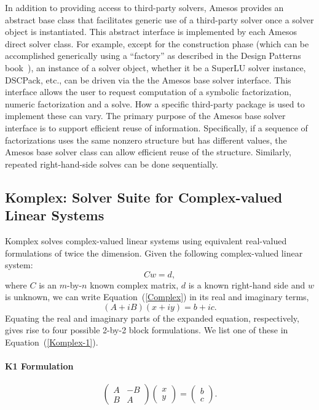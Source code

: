 \documentclass[acmtoms,acmnow]{acmtrans2m}
\begin{document}
In addition to providing access to third-party solvers, Amesos
provides an abstract base class that facilitates generic use of a
third-party solver once a solver object is instantiated.  This
abstract interface is implemented by each Amesos direct solver class.
For example, except for the construction phase (which can be
accomplished generically using a ``factory'' as described in the
Design Patterns book~\cite{Gamma}), an instance of a solver object,
whether it be a SuperLU solver instance, DSCPack, etc., can be driven
via the the Amesos base solver interface.  This interface allows the
user to request computation of a symbolic factorization, numeric
factorization and a solve.  How a specific third-party package is used
to implement these can vary.  The primary purpose of the Amesos base
solver interface is to support efficient reuse of information.
Specifically, if a sequence of factorizations uses the same nonzero
structure but has different values, the Amesos base solver class can
allow efficient reuse of the structure.  Similarly, repeated
right-hand-side solves can be done sequentially.

\subsection{Komplex: Solver Suite for Complex-valued Linear Systems}

Komplex solves complex-valued linear systems using equivalent 
real-valued formulations of twice the dimension.  Given the following 
complex-valued linear system:
\begin{equation}
\label{Complex}
C w = d,
\end{equation}
where $C$ is an $m$-by-$n$ known
complex matrix, $d$ is a known right-hand side and $w$ is unknown, 
we can write Equation~(\ref{Complex})
in its real and imaginary terms,
\begin{equation}\label{linearsystem}
( A + i B )(x+iy) = b+ic.
\end{equation}
Equating the real and imaginary parts of the expanded equation, 
respectively, gives rise to four
possible 2-by-2 block formulations.  We list one of these in 
Equation~(\ref{Komplex-1}).
\paragraph*{K1 Formulation}
\begin{equation}\label{Komplex-1}
   \left( \begin{array}{rr}
                       A & -B  \\
                       B &  A
   \end{array}
   \right)
   \left( \begin{array}{r}
                                    x  \\
                                    y
                             \end{array}
   \right)
   =
   \left( \begin{array}{r}
                                    b  \\
                                    c
                             \end{array}
   \right).
\end{equation}
\end{document}
